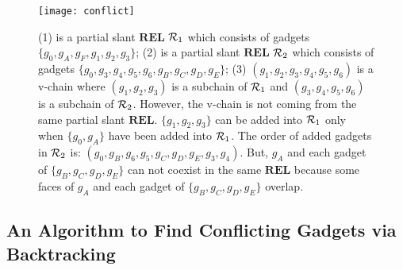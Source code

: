 \documentclass[11pt]{article}
\newcommand{\R}{{\cal R}}
\newcommand{\REL}{\mathbf{REL}}
\begin{document}
\begin{figure}[t]
\centering
\texttt{[image: conflict]}
\caption{(1) is a partial slant $\REL$ $\R_1 $ which
consists of gadgets $\{g_0, g_A, g_F, g_1, g_2, g_3\}$;
(2) is a partial slant $\REL$ $\R_2$ which
consists of gadgets $\{g_0, g_3, g_4, g_5, g_6, g_B, g_C, g_D, g_E\}$;
(3) $(g_1, g_2, g_3, g_4, g_5, g_6)$ is a v-chain where
$(g_1, g_2, g_3)$ is a subchain of $\R_1$ and
$(g_3, g_4, g_5, g_6)$ is a subchain of $\R_2$.
However, the v-chain is not coming from the same partial slant $\REL$.
$\{g_1, g_2, g_3\}$ can be added into $\R_1$ only when $\{g_0, g_A\}$ have been
added into $\R_1$.
The order of added gadgets in $\R_2$ is:
$(g_0, g_B, g_6, g_5, g_C, g_D, g_E, g_3, g_4)$.
But, $g_A$ and each gadget of $\{g_B, g_C, g_D, g_E\}$ can not coexist in the
same $\REL$ because
some faces of $g_A$ and each gadget of $\{g_B, g_C, g_D, g_E\}$
overlap.
}\label{fig:conflict}
\end{figure}


\subsection{An Algorithm to Find Conflicting Gadgets via Backtracking}\label{sec:backtrack-conflict-gadgets}
\end{document}
